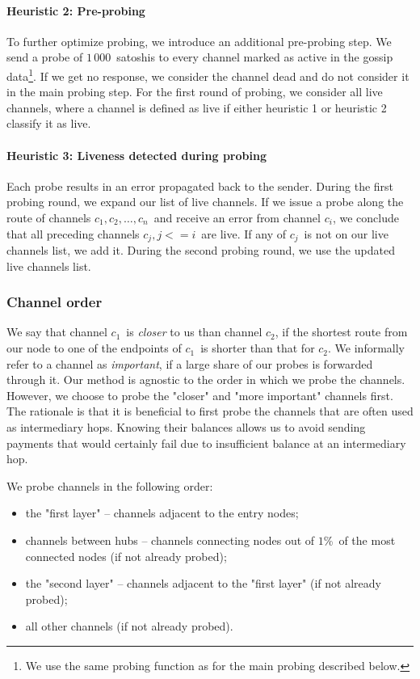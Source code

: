 \paragraph{Heuristic 2: Pre-probing}
To further optimize probing, we introduce an additional pre-probing step.
We send a probe of $1\,000$~satoshis to every channel marked as active in the gossip data\footnote{We use the same probing function as for the main probing described below.}.
If we get no response, we consider the channel dead and do not consider it in the main probing step.
For the first round of probing, we consider all live channels, where a channel is defined as live if either heuristic 1 or heuristic 2 classify it as live.

\paragraph{Heuristic 3: Liveness detected during probing}
Each probe results in an error propagated back to the sender.
During the first probing round, we expand our list of live channels.
If we issue a probe along the route of channels $c_1, c_2, \dots, c_n$~and receive an error from channel $c_i$, we conclude that all preceding channels $c_j, j<=i$~are live.
If any of $c_j$~is not on our live channels list, we add it.
During the second probing round, we use the updated live channels list.


\subsubsection*{Channel order}
We say that channel $c_1$~is \textit{closer} to us than channel $c_2$, if the shortest route from our node to one of the endpoints of $c_1$~is shorter than that for $c_2$.
We informally refer to a channel as \textit{important}, if a large share of our probes is forwarded through it.
Our method is agnostic to the order in which we probe the channels.
However, we choose to probe the "closer" and "more important" channels first.
The rationale is that it is beneficial to first probe the channels that are often used as intermediary hops.
Knowing their balances allows us to avoid sending payments that would certainly fail due to insufficient balance at an intermediary hop.

We probe channels in the following order:

\begin{itemize}
	\item the "first layer" -- channels adjacent to the entry nodes;
	\item channels between hubs -- channels connecting nodes out of $1$\%~of the most connected nodes (if not already probed);
	\item the "second layer" -- channels adjacent to the "first layer" (if not already probed);
	\item all other channels (if not already probed).
\end{itemize}


